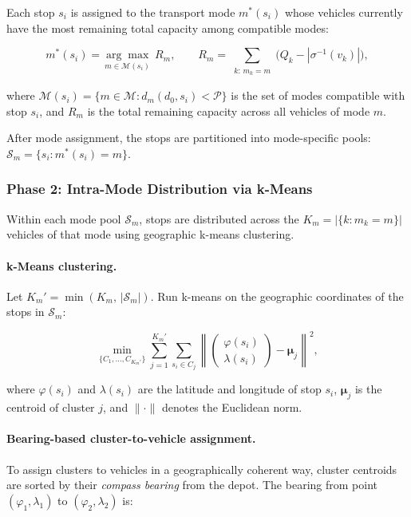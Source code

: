 \documentclass[12pt, a4paper]{article}
\theoremstyle{definition}
\begin{document}
Each stop $s_i$ is assigned to the transport mode $m^*(s_i)$ whose vehicles
currently have the most remaining total capacity among compatible modes:

\begin{equation}
  \label{eq:mode_assign}
  m^*(s_i) = \underset{m \in \mathcal{M}(s_i)}{\arg\max}\;
    R_m, \qquad
  R_m = \sum_{\substack{k:\, m_k = m}} \bigl(Q_k - |\sigma^{-1}(v_k)|\bigr),
\end{equation}

\noindent where $\mathcal{M}(s_i) = \{m \in \mathcal{M} : d_m(d_0, s_i) < \mathcal{P}\}$
is the set of modes compatible with stop $s_i$, and $R_m$ is the total
remaining capacity across all vehicles of mode $m$.

After mode assignment, the stops are partitioned into mode-specific pools:
$\mathcal{S}_m = \{s_i : m^*(s_i) = m\}$.

\subsubsection{Phase 2: Intra-Mode Distribution via k-Means}

Within each mode pool $\mathcal{S}_m$, stops are distributed across the
$K_m = |\{k : m_k = m\}|$ vehicles of that mode using geographic k-means
clustering.

\paragraph{k-Means clustering.}
Let $K_m' = \min(K_m,\, |\mathcal{S}_m|)$.  Run k-means on the geographic
coordinates of the stops in $\mathcal{S}_m$:

\begin{equation}
  \label{eq:kmeans}
  \min_{\{C_1,\ldots,C_{K_m'}\}}
    \sum_{j=1}^{K_m'} \sum_{s_i \in C_j}
    \left\| \begin{pmatrix} \varphi(s_i) \\ \lambda(s_i) \end{pmatrix}
           - \boldsymbol{\mu}_j \right\|^2,
\end{equation}

\noindent where $\varphi(s_i)$ and $\lambda(s_i)$ are the latitude and
longitude of stop $s_i$, $\boldsymbol{\mu}_j$ is the centroid of cluster $j$,
and $\|\cdot\|$ denotes the Euclidean norm.

\paragraph{Bearing-based cluster-to-vehicle assignment.}
To assign clusters to vehicles in a geographically coherent way, cluster
centroids are sorted by their \emph{compass bearing} from the depot.  The
bearing from point $(\varphi_1, \lambda_1)$ to $(\varphi_2, \lambda_2)$ is:
\end{document}
